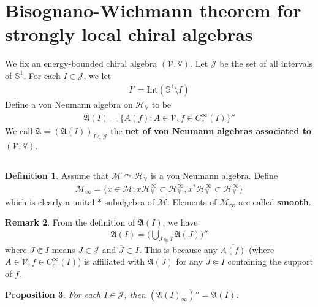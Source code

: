 \documentclass[12pt,b5paper,notitlepage]{article}
\theoremstyle{definition}
\newtheorem{df}{Definition}[section]
\newtheorem{rem}[df]{Remark}
\theoremstyle{plain}
\newtheorem{pp}[df]{Proposition}
\newcommand{\fk}{\mathfrak}
\newcommand{\mc}{\mathcal}
\newcommand{\ovl}{\overline}
\newcommand{\Vbb}{\mathbb V}
\newcommand{\Sbb}{{\mathbb S}}
\newcommand{\Int}{\mathrm{Int}}
\newcommand{\HV}{\mathcal H_{\mathbb V}}
\numberwithin{equation}{section}
\begin{document}
\newpage



\section{Bisognano-Wichmann theorem for strongly local chiral algebras}




We fix an energy-bounded chiral algebra $(\mc V,\Vbb)$. Let $\mc J$ be the set of all intervals of $\Sbb^1$. For each $I\in\mc J$, we let\index{I@$I'=\Int(\Sbb^1\setminus I)$}
\begin{align*}
I'=\Int(\Sbb^1\setminus I)
\end{align*}
Define a von Neumann algebra on $\HV$ to be
\begin{align*}
\fk A(I)=\{\ovl{A(f)}:A\in\mc V,f\in C_c^\infty(I)\}''
\end{align*}
We call $\fk A=(\fk A(I))_{I\in\mc J}$ the \textbf{net of von Neumann algebras associated to $(\mc V,\Vbb)$}.






\subsection{}


\begin{df}
Assume that $\mc M\curvearrowright\HV$ is a von Neumann algebra. Define
\begin{align*}
\mc M_\infty=\{x\in\mc M:x\HV^\infty\subset\HV^\infty,x^*\HV^\infty\subset\HV^\infty\}
\end{align*}
which is clearly a unital $*$-subalgebra of $\mc M$. Elements of $\mc M_\infty$ are called \textbf{smooth}.
\end{df}


\begin{rem}\label{lb96}
From the definition of $\fk A(I)$, we have
\begin{align*}
\fk A(I)=\bigg(\bigcup_{J\Subset I}\fk A(J)\bigg)''
\end{align*}
where $J\Subset I$ means $J\in\mc J$ and $\ovl J\subset I$. This is because any $\ovl{A(f)}$ (where $A\in\mc V,f\in C_c^\infty(I)$) is affiliated with $\fk A(J)$ for any $J\Subset I$ containing the support of $f$.
\end{rem}


\begin{pp}\label{lb97}
For each $I\in\mc J$, then $(\fk A(I)_\infty)''=\fk A(I)$.
\end{pp}
\end{document}

